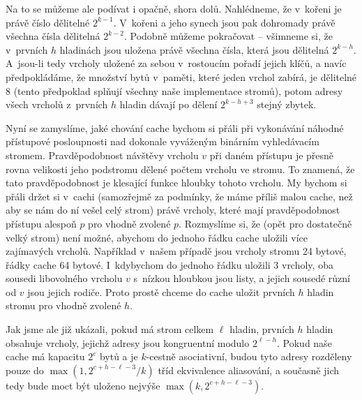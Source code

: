 Na to se můžeme ale podívat i opačně, shora dolů. Nahlédneme, že v~kořeni je právě číslo dělitelné $2^{k-1}$. V~kořeni a jeho synech jsou pak dohromady právě všechna čísla dělitelná $2^{k-2}$. Podobně můžeme pokračovat -- všimneme si, že v~prvních $h$ hladinách jsou uložena právě všechna čísla, která jsou dělitelná $2^{k-h}$. A~jsou-li tedy vrcholy uložené za sebou v~rostoucím pořadí jejich klíčů, a navíc předpokládáme, že množství bytů v~paměti, které jeden vrchol zabírá, je dělitelné 8 (tento předpoklad splňují všechny naše implementace stromů), potom adresy všech vrcholů z~prvních $h$ hladin dávají po dělení $2^{k-h+3}$ stejný zbytek.

Nyní se zamyslíme, jaké chování cache bychom si přáli při vykonávání náhodné
přístupové posloupnosti nad dokonale vyváženým binárním vyhledávacím stromem.
Pravděpodobnost návštěvy vrcholu $v$ při daném přístupu je přesně rovna
velikosti jeho podstromu dělené počtem vrcholu ve stromu. To znamená, že tato
pravděpodobnost je klesající funkce hloubky tohoto vrcholu. My bychom si přáli
držet si v~cachi (samozřejmě za podmínky, že máme příliš malou cache, než aby
se nám do ní vešel celý strom) právě vrcholy, které mají pravděpodobnost
přístupu alespoň $p$ pro vhodně zvolené $p$. Rozmyslíme si, že (opět pro
dostatečně velký strom) není možné, abychom do jednoho řádku cache uložili
více zajímavých vrcholů. Například v~našem případě jsou vrcholy stromu 24
bytové, řádky cache 64 bytové. I~kdybychom do jednoho řádku uložili 3 vrcholy,
oba sousedi libovolného vrcholu $v$ s~nízkou hloubkou jsou listy, a jejich
sousedé různí od $v$ jsou jejich rodiče. Proto prostě chceme do cache uložit
prvních $h$ hladin stromu pro vhodně zvolené $h$.

Jak jsme ale již ukázali, pokud má strom celkem $\ell$ hladin, prvních $h$
hladin obsahuje vrcholy, jejichž adresy jsou kongruentní modulo $2^{\ell - h}$.
Pokud naše cache má kapacitu $2^c$ bytů a je $k$-cestně asociativní, budou tyto adresy
rozděleny pouze do $\max\left(1, 2^{c+h-\ell - 3}/k\right)$ tříd
ekvivalence aliasování, a současně jich tedy bude moct být uloženo nejvýše
$\max\left(k, 2^{c+h-\ell - 3}\right).$

